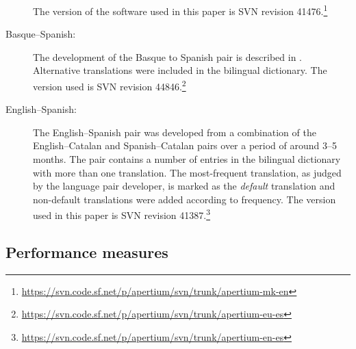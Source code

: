 \documentclass[11pt]{article}
\newcommand{\comment}[1]{\todo{#1}}
\begin{document}
\begin{description}
The version of
  the software used in this paper is SVN revision
  41476.\footnote{\url{https://svn.code.sf.net/p/apertium/svn/trunk/apertium-mk-en}}
\item[Basque--Spanish:] The development of the Basque to Spanish pair
  is described in \cite{ginesti09}. 
  Alternative translations were included in the bilingual
  dictionary. The version used is SVN revision 44846.\footnote{\url{https://svn.code.sf.net/p/apertium/svn/trunk/apertium-eu-es}}

\item[English--Spanish:] The English--Spanish pair was developed from
  a combination of the English--Catalan and Spanish--Catalan pairs
  over a period of around 3--5 months. The pair
  contains a number of entries in the bilingual dictionary with more
  than one translation. The most-frequent translation, as judged by
  the language pair developer, is marked as the \emph{default}
  translation and non-default translations were added according to
  frequency.   The
  version used in this paper is SVN revision
  41387.\footnote{\url{https://svn.code.sf.net/p/apertium/svn/trunk/apertium-en-es}}
\end{description}


\subsection{Performance measures}
\label{ss:measures}
\end{document}
